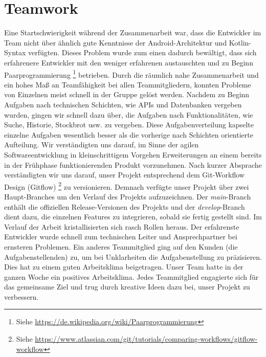 \documentclass[a4paper]{article}
\begin{document}
\section{Teamwork}
\label{sec:teamwork}
Eine Startschwierigkeit während der Zusammenarbeit war, dass die Entwickler im Team nicht über ähnlich gute Kenntnisse der Android-Architektur und Kotlin-Syntax verfügten. Dieses Problem wurde zum einen dadurch bewältigt, dass sich erfahrenere Entwickler mit den weniger erfahrenen austauschten und zu Beginn Paarprogrammierung \footnote{Siehe \url{https://de.wikipedia.org/wiki/Paarprogrammierung}} betrieben. Durch die räumlich nahe Zusammenarbeit und ein hohes Maß an Teamfähigkeit bei allen Teammitgliedern, konnten Probleme von Einzelnen meist schnell in der Gruppe gelöst werden. Nachdem zu Beginn Aufgaben nach technischen Schichten, wie APIs und Datenbanken vergeben wurden, gingen wir schnell dazu über, die Aufgaben nach Funktionalitäten, wie Suche, Historie, Stockbrot usw. zu vergeben. Diese Aufgabenverteilung kapselte einzelne Aufgaben wesentlich besser als die vorherige nach Schichten orientierte Aufteilung. Wir verständigten uns darauf, im Sinne der agilen Softwareentwicklung in kleinschrittigem Vorgehen Erweiterungen an einem bereits in der Frühphase funktionierenden Produkt vorzunehmen. Nach kurzer Absprache verständigten wir uns darauf, unser Projekt entsprechend dem Git-Workflow Design (Gitflow) \footnote{Siehe \url{https://www.atlassian.com/git/tutorials/comparing-workflows/gitflow-workflow}} zu versionieren. Demnach verfügte unser Projekt über zwei Haupt-Branches um den Verlauf des Projekts aufzuzeichnen. Der \textit{main}-Branch enthält die offiziellen Release-Versionen des Projekts und der \textit{develop}-Branch dient dazu, die einzelnen Features zu integrieren, sobald sie fertig gestellt sind. \newline
Im Verlauf der Arbeit kristallisierten sich rasch Rollen heraus. Der erfahrenste Entwickler wurde schnell zum technischen Leiter und Ansprechpartner bei ernsteren Problemen. Ein anderes Teammitglied ging auf den Kunden (die Aufgabenstellenden) zu, um bei Unklarheiten die Aufgabenstellung zu präzisieren. Dies hat zu einem guten Arbeitsklima beigetragen. \newline
Unser Team hatte in der ganzen Woche ein positives Arbeitsklima. Jedes Teammitglied engagierte sich für das gemeinsame Ziel und trug durch kreative Ideen dazu bei, unser Projekt zu verbessern.
\end{document}
